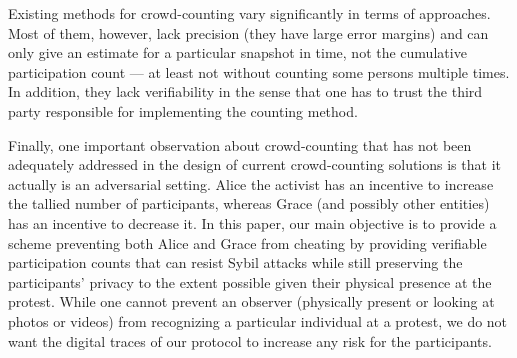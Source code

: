 Existing methods for crowd-counting vary significantly in terms of approaches.
Most of them, however, lack precision (\ie they have large error margins) and can only give an estimate for a particular snapshot in time, not the cumulative participation count --- at least not without counting some persons multiple times.  In addition, they lack verifiability in the sense that one has to trust the third party responsible for implementing the counting method.

Finally, one important observation about crowd-counting that has not been adequately addressed in the design of current crowd-counting solutions is that it actually is an adversarial setting. Alice the activist has an incentive to increase the tallied number of participants, whereas Grace (and possibly other entities) has an incentive to decrease it.
In this paper, our main objective is to provide a scheme preventing both Alice 
and Grace from cheating by providing verifiable participation counts that can resist Sybil attacks while still preserving the participants' privacy to the extent possible given their physical presence at the protest. While one cannot
prevent an observer (physically present or looking at photos or videos) from recognizing a particular individual at a protest, we do not want the digital traces of our protocol to increase any risk for the participants.



%

